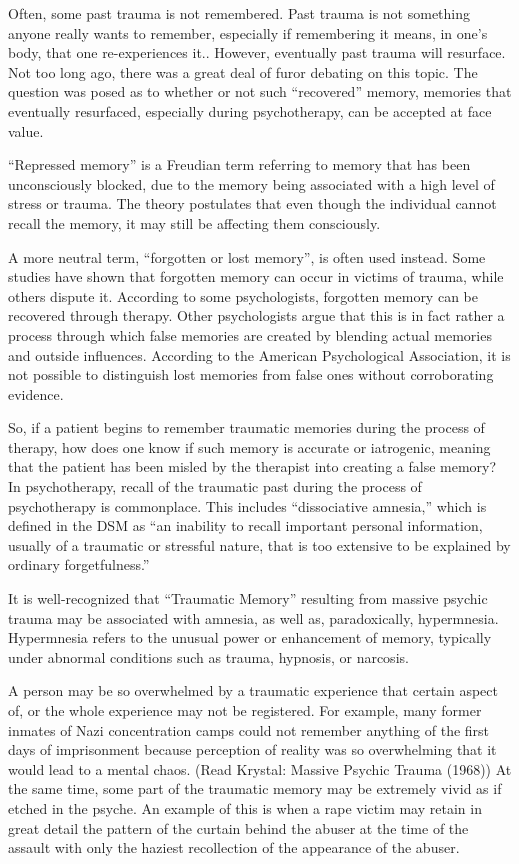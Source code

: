 \documentclass[]{book}
\begin{document}
Often, some past trauma is not remembered. Past trauma is not something anyone really wants to remember, especially if remembering it means, in one's body, that one re-experiences it.. However, eventually past trauma will resurface. Not too long ago, there was a great deal of furor debating on this topic. The question was posed as to whether or not such ``recovered'' memory, memories that eventually resurfaced, especially during psychotherapy, can be accepted at face value.

``Repressed memory'' is a Freudian term referring to memory that has been unconsciously blocked, due to the memory being associated with a high level of stress or trauma. The theory postulates that even though the individual cannot recall the memory, it may still be affecting them consciously.

A more neutral term, ``forgotten or lost memory'', is often used instead. Some studies have shown that forgotten memory can occur in victims of trauma, while others dispute it. According to some psychologists, forgotten memory can be recovered through therapy. Other psychologists argue that this is in fact rather a process through which false memories are created by blending actual memories and outside influences. According to the American Psychological Association, it is not possible to distinguish lost memories from false ones without corroborating evidence.

So, if a patient begins to remember traumatic memories during the process of therapy, how does one know if such memory is accurate or iatrogenic, meaning that the patient has been misled by the therapist into creating a false memory? In psychotherapy, recall of the traumatic past during the process of psychotherapy is commonplace. This includes ``dissociative amnesia,'' which is defined in the DSM as ``an inability to recall important personal information, usually of a traumatic or stressful nature, that is too extensive to be explained by ordinary forgetfulness.''

It is well-recognized that ``Traumatic Memory'' resulting from massive psychic trauma may be associated with amnesia, as well as, paradoxically, hypermnesia. Hypermnesia refers to the unusual power or enhancement of memory, typically under abnormal conditions such as trauma, hypnosis, or narcosis.

A person may be so overwhelmed by a traumatic experience that certain aspect of, or the whole experience may not be registered. For example, many former inmates of Nazi concentration camps could not remember anything of the first days of imprisonment because perception of reality was so overwhelming that it would lead to a mental chaos. (Read Krystal: Massive Psychic Trauma (1968)) At the same time, some part of the traumatic memory may be extremely vivid as if etched in the psyche. An example of this is when a rape victim may retain in great detail the pattern of the curtain behind the abuser at the time of the assault with only the haziest recollection of the appearance of the abuser.
\end{document}
